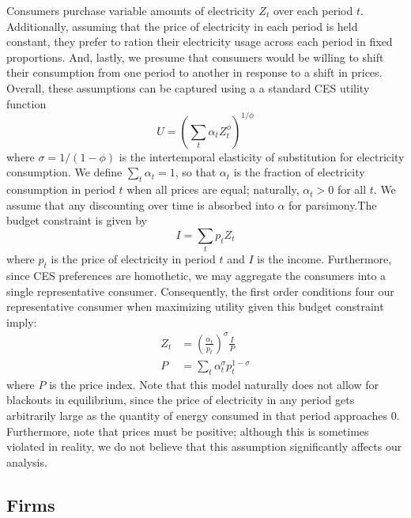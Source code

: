 \documentclass[11pt,a4paper]{extarticle}
\begin{document}
Consumers purchase variable amounts of electricity $Z_t$ over each period $t$. Additionally, assuming that the price of electricity in each period is held constant, they prefer to ration their electricity usage across each period in fixed proportions. And, lastly, we presume that consumers would be willing to shift their consumption from one period to another in response to a shift in prices. Overall, these assumptions can be captured using a a standard CES utility function
\begin{equation}
U = \left( \sum_t \alpha_t Z_t^\phi  \right)^{1/\phi}
\end{equation}
where $\sigma = 1/(1-\phi)$ is the intertemporal elasticity of substitution for electricity consumption. We define $\sum_t \alpha_t = 1$, so that $\alpha_t$ is the fraction of electricity consumption in period $t$ when all prices are equal; naturally, $\alpha_t > 0$ for all $t$. We assume that any discounting over time is absorbed into $\alpha$ for parsimony.The budget constraint is given by
\begin{equation}
I = \sum_t p_t Z_t
\end{equation}
where $p_t$ is the price of electricity in period $t$ and $I$ is the income. Furthermore, since CES preferences are homothetic, we may aggregate the consumers into a single representative consumer. Consequently, the first order conditions four our representative consumer when maximizing utility given this budget constraint imply:
\begin{align}
Z_t &= \left(\frac{\alpha_t}{p_t} \right)^\sigma \frac{I}{P} \\
P &= \sum_t \alpha_t^\sigma p_t^{1-\sigma}
\end{align}
where $P$ is the price index. Note that this model naturally does not allow for blackouts in equilibrium, since the price of electricity in any period gets arbitrarily large as the quantity of energy consumed in that period approaches 0. Furthermore, note that prices must be positive; although this is sometimes violated in reality, we do not believe that this assumption significantly affects our analysis. 

\subsection{Firms}
\end{document}
